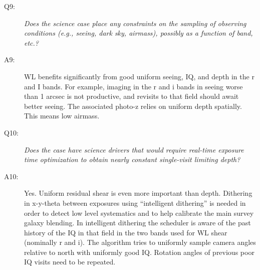 \begin{description}
\item[Q9:] {\it Does the science case place any constraints on the
sampling of observing conditions (e.g., seeing, dark sky, airmass),
possibly as a function of band, etc.?}

\item[A9:] WL benefits significantly from good uniform seeing, IQ, and
depth in the r and I bands. For example, imaging in the r and i bands in
seeing worse than 1 arcsec is not productive, and revisits to that field
should await better seeing. The associated photo-z relies on uniform
depth spatially. This means low airmass.

\item[Q10:] {\it Does the case have science drivers that would require
real-time exposure time optimization to obtain nearly constant
single-visit limiting depth?}

\item[A10:] Yes. Uniform residual shear is even more important than
depth. Dithering in x-y-theta between exposures using “intelligent
dithering” is needed in order to detect low level systematics and to
help calibrate the main survey galaxy blending. In intelligent dithering
the scheduler is aware of the past history of the IQ in that field in
the two bands used for WL shear (nominally r and i). The algorithm tries
to uniformly sample camera angles relative to north with uniformly good
IQ. Rotation angles of previous poor IQ visits need to be repeated.

\end{description}

\navigationbar



